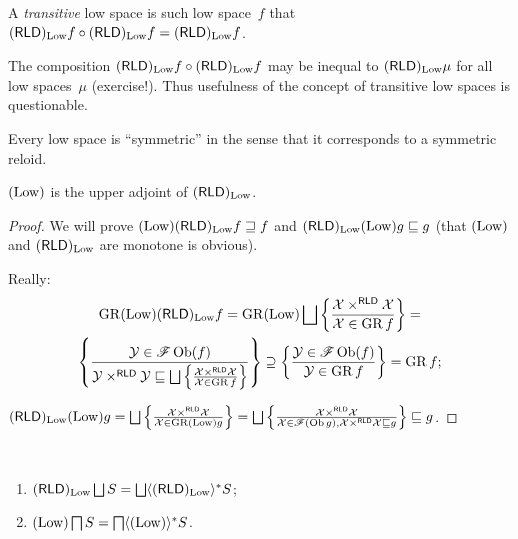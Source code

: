 \begin{defn}
A \emph{transitive} low space is such low space~$f$ that $(\mathsf{RLD})_{\operatorname{Low}}f\circ(\mathsf{RLD})_{\operatorname{Low}}f=(\mathsf{RLD})_{\operatorname{Low}}f$.
\end{defn}

\begin{rem}
The composition $(\mathsf{RLD})_{\operatorname{Low}}f\circ(\mathsf{RLD})_{\operatorname{Low}}f$ may be inequal to $(\mathsf{RLD})_{\operatorname{Low}}\mu$ for all low spaces~$\mu$ (exercise!).
Thus usefulness of the concept of transitive low spaces is questionable.
\end{rem}

\begin{rem}
Every low space is ``symmetric'' in the sense that it corresponds to a symmetric reloid.
\end{rem}

\begin{thm}
  $(\operatorname{Low})$ is the upper adjoint of $(\mathsf{RLD})_{\operatorname{Low}}$.
\end{thm}

\begin{proof}
  We will prove $(\operatorname{Low}) (\mathsf{RLD})_{\operatorname{Low}} f \sqsupseteq
  f$ and $(\mathsf{RLD})_{\operatorname{Low}} (\operatorname{Low}) g \sqsubseteq g$
  (that $(\operatorname{Low})$ and $(\mathsf{RLD})_{\operatorname{Low}}$ are monotone
  is obvious).
  
  Really:
  \begin{multline*}
  \GR (\Low) (\mathsf{RLD})_{\Low} f =
  \GR (\Low) \bigsqcup \setcond{ \mathcal{X}
  \times^{\mathsf{RLD}} \mathcal{X} }{
  \mathcal{X} \in \GR f } = \\
  \setcond{ \mathcal{Y} \in \mathscr{F}\Ob (f) }{ \mathcal{Y}
  \times^{\mathsf{RLD}} \mathcal{Y} \sqsubseteq \bigsqcup \setcond{
  \mathcal{X} \times^{\mathsf{RLD}} \mathcal{X} }{
  \mathcal{X} \in \GR f } } \supseteq \setcond{
  \mathcal{Y} \in \mathscr{F} \Ob (f) }{
  \mathcal{Y} \in \GR f } = \GR f;
  \end{multline*}
  
  $(\mathsf{RLD})_{\Low} (\Low) g = \bigsqcup \setcond{
  \mathcal{X} \times^{\mathsf{RLD}} \mathcal{X} }{
  \mathcal{X} \in \GR (\Low) g } = \bigsqcup
  \setcond{ \mathcal{X} \times^{\mathsf{RLD}} \mathcal{X} }{
  \mathcal{X} \in \mathscr{F}(\Ob g),
  \mathcal{X} \times^{\mathsf{RLD}} \mathcal{X}
  \sqsubseteq g } \sqsubseteq g$.
\end{proof}

\begin{cor}
  ~
  \begin{enumerate}
    \item $(\mathsf{RLD})_{\Low} \bigsqcup S = \bigsqcup \langle
    (\mathsf{RLD})_{\Low} \rangle^{\ast} S$;
    
    \item $(\operatorname{Low}) \bigsqcap S = \bigsqcap \langle (\operatorname{Low})
    \rangle^{\ast} S$.
  \end{enumerate}
\end{cor}

